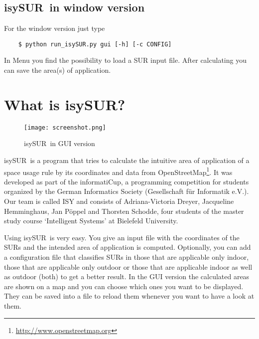 \documentclass[11pt,fleqn]{book} %
\newcommand{\ProjectTitle}{isySUR}
\newcommand{\pt}{\ProjectTitle}
\begin{document}
\subsection{\ProjectTitle\ in window version}\label{sec:QuickstartWindow}
For the window version just type
\begin{verbatim}
	$ python run_isySUR.py gui [-h] [-c CONFIG]
\end{verbatim}
In Menu you find the possibility to load a SUR input file. After calculating you can save the area(s) of application.

\section{What is \ProjectTitle?}\label{sec:whatFor}
\begin{figure}
\centering
\texttt{[image: screenshot.png]}
\caption{\pt\ in GUI version}
\end{figure}
\pt\ is a program that tries to calculate the intuitive area of application of a space usage rule by its coordinates and data from OpenStreetMap\footnote{\url{http://www.openstreetmap.org}}. It was developed as part of the informatiCup, a programming competition for students organized by the German Informatics Society (Gesellschaft für Informatik e.V.). Our team is called ISY and consists of Adriana-Victoria Dreyer, Jacqueline Hemminghaus, Jan Pöppel and Thorsten Schodde, four students of the master study course `Intelligent Systems' at Bielefeld University.

Using \pt\ is very easy. You give an input file with the coordinates of the SURs and the intended area of application is computed. Optionally, you can add a configuration file that classifies SURs in those that are applicable only indoor, those that are applicable only outdoor or those that are applicable indoor as well as outdoor (both) to get a better result. In the GUI version the calculated areas are shown on a map and you can choose which ones you want to be displayed. They can be saved into a file to reload them whenever you want to have a look at them.
\end{document}
